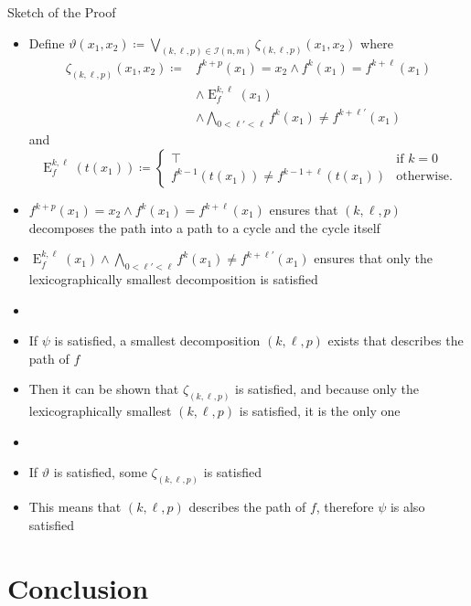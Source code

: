 \documentclass[aspectratio=169]{beamer}
\renewcommand{\theta}{\vartheta}
\begin{document}
	\begin{frame}[allowframebreaks]{Sketch of the Proof}
		\begin{itemize}
			\item Define $\theta(x_1,x_2)\coloneqq \bigvee_{(k,\ell,p)\in \mathcal I(n,m)} \zeta_{(k,\ell,p)}(x_1,x_2)$ where
			\begin{align*}
				\zeta_{(k,\ell,p)}(x_1,x_2)\coloneqq & f^{k+p}(x_1)=x_2 \land f^{k}(x_1)=f^{k+\ell}(x_1) \\
				& \land \operatorname{E}^{k,\ell}_{f}(x_1)  \\
				& \land \bigwedge_{0<\ell'<\ell}f^{k}(x_1)\neq f^{k+\ell'}(x_1)
			\end{align*}
			and
			$$\operatorname{E}^{k,\ell}_{f}(t(x_1))\coloneqq\begin{cases}
				\top & \text{if } k=0 \\
				f^{k-1}(t(x_1))\neq f^{k-1+\ell}(t(x_1)) & \text{otherwise}.
			\end{cases}$$
			\item $f^{k+p}(x_1)=x_2 \land f^{k}(x_1)=f^{k+\ell}(x_1)$ ensures that $(k,\ell,p)$ decomposes the path into a path to a cycle and the cycle itself
			\item $\operatorname{E}^{k,\ell}_{f}(x_1) \land \bigwedge_{0<\ell'<\ell}f^{k}(x_1)\neq f^{k+\ell'}(x_1)$ ensures that only the lexicographically smallest decomposition is satisfied
			\item[]
			\item If $\psi$ is satisfied, a smallest decomposition $(k,\ell,p)$ exists that describes the path of $f$
			\item Then it can be shown that $\zeta_{(k,\ell,p)}$ is satisfied, and because only the lexicographically smallest $(k,\ell,p)$ is satisfied, it is the only one
			\item[]
			\item If $\theta$ is satisfied, some $\zeta_{(k,\ell,p)}$ is satisfied
			\item This means that $(k,\ell,p)$ describes the path of $f$, therefore $\psi$ is also satisfied
		\end{itemize}
	\end{frame}
	
	\section{Conclusion}
	
\end{document}
